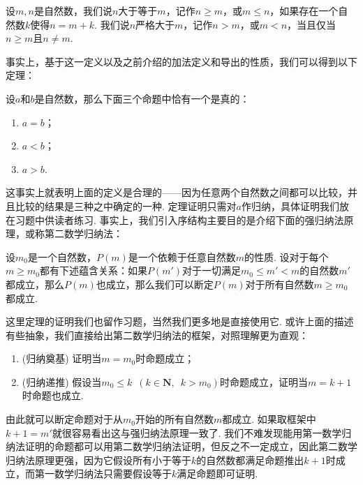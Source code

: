 \begin{definition}%
    设$m,n$是自然数，我们说$n$大于等于$m$，记作$n\geqslant m$，或$m\leqslant n$，如果存在一个自然数$k$使得$n=m+k$. 我们说$n$严格大于$m$，记作$n>m$，或$m<n$，当且仅当$n\geqslant m$且$n\neq m$.
\end{definition}

事实上，基于这一定义以及之前介绍的加法定义和导出的性质，我们可以得到以下定理：

\begin{theorem}
    设$a$和$b$是自然数，那么下面三个命题中恰有一个是真的：
    \begin{enumerate}
        \item $a=b$；

        \item $a<b$；

        \item $a>b$.
    \end{enumerate}
\end{theorem}

这事实上就表明上面的定义是合理的——因为任意两个自然数之间都可以比较，并且比较的结果是三种之中确定的一种. 定理证明只需对$a$作归纳，具体证明我们放在习题中供读者练习. 事实上，我们引入序结构主要目的是介绍下面的强归纳法原理，或称第二数学归纳法：

\begin{theorem}%
    \label{thm:1e:强归纳法原理} 
    设$m_0$是一个自然数，$P(m)$是一个依赖于任意自然数$m$的性质. 设对于每个$m\geqslant m_0$都有下述蕴含关系：如果$P(m')$对于一切满足$m_0\leqslant m'<m$的自然数$m'$都成立，那么$P(m)$也成立，那么我们可以断定$P(m)$对于所有自然数$m\geqslant m_0$都成立.
\end{theorem}

这里定理的证明我们也留作习题，当然我们更多地是直接使用它. 或许上面的描述有些抽象，我们直接给出第二数学归纳法的框架，对照理解更为直观：
\begin{enumerate}
    \item (归纳奠基) 证明当$m=m_0$时命题成立；

    \item (归纳递推) 假设当$m_0\leqslant k\enspace(k\in\mathbf{N},\enspace k>m_0)$时命题成立，证明当$m=k+1$时命题也成立.
\end{enumerate}
由此就可以断定命题对于从$m_0$开始的所有自然数$m$都成立. 如果取框架中$k+1=m'$就很容易看出这与强归纳法原理一致了. 我们不难发现能用第一数学归纳法证明的命题都可以用第二数学归纳法证明，但反之不一定成立，因此第二数学归纳法原理更强，因为它假设所有小于等于$k$的自然数都满足命题推出$k+1$时成立，而第一数学归纳法只需要假设等于$k$满足命题即可证明.

